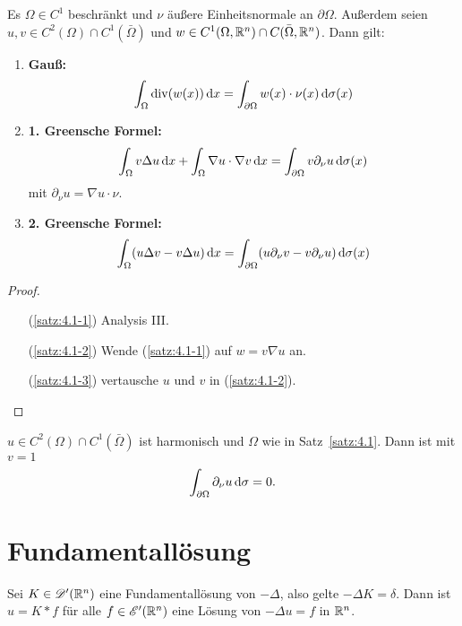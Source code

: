 \begin{satz}
  \label{satz:4.1}
  Es $\Omega\in C^1$ beschränkt und $\nu$ äußere Einheitsnormale an $\partial\Omega$. Außerdem seien $u,v\in C^2(\Omega)\cap C^1(\bar\Omega)$ und $w\in C^1(\Omega,\mathbb{R}^n)\cap C(\bar\Omega,\mathbb{R}^n)$. Dann gilt:
  \begin{enumerate}[\rm(i)]
  \item \label{satz:4.1-1} \textbf{Gauß:}
    \[
    \int_\Omega \operatorname{div}(w(x))\,\mathrm{d} x=\int_{\partial\Omega}w(x)\cdot\nu(x)\,\mathrm{d}\sigma(x)
    \]
  \item \label{satz:4.1-2} \textbf{1. Greensche Formel:}
    \[
    \int_\Omega v\Delta u\,\mathrm{d} x+\int_\Omega\nabla u\cdot\nabla v\,\mathrm{d} x
    =\int_{\partial\Omega}v\partial_\nu u\,\mathrm{d}\sigma(x)
    \]
    mit $\partial_\nu u=\nabla u\cdot\nu$.
  \item \label{satz:4.1-3} \textbf{2. Greensche Formel:}
    \[
    \int_\Omega (u\Delta v-v\Delta u)\,\mathrm{d} x
    = \int_{\partial\Omega}(u\partial_\nu v-v\partial_\nu u)\,\mathrm{d}\sigma(x)
    \]
  \end{enumerate}
\end{satz}

\begin{proof}
  \begin{itemize}
  \item[(\ref{satz:4.1-1})] Analysis III.
  \item[(\ref{satz:4.1-2})] Wende (\ref{satz:4.1-1}) auf $w=v\nabla u$ an.
  \item[(\ref{satz:4.1-3})] vertausche $u$ und $v$ in (\ref{satz:4.1-2}). \qedhere
  \end{itemize}
\end{proof}

\begin{bem}
  $u\in C^2(\Omega)\cap C^1(\bar\Omega)$ ist harmonisch und $\Omega$ wie in Satz~\ref{satz:4.1}. Dann ist mit $v=1$
  \[ \int_{\partial\Omega}\partial_\nu u\,\mathrm{d}\sigma=0. \]
\end{bem}

\section{Fundamentallösung}

Sei $K\in\mathscr{D}'(\mathbb{R}^n)$ eine Fundamentallösung von $-\Delta$, also gelte $-\Delta K=\delta$. Dann ist $u=K\ast f$ für alle $f\in\mathscr{E}'(\mathbb{R}^n)$ eine Lösung von $-\Delta u=f$ in $\mathbb{R}^n$.


